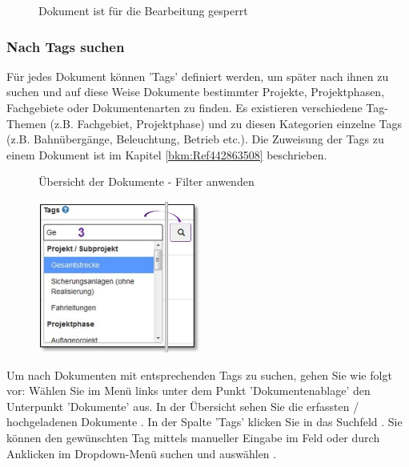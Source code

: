 \begin{figure}[H]
\caption{Dokument ist für die Bearbeitung gesperrt}
\end{figure}

\subsubsection{Nach Tags suchen}
\label{bkm:Ref442275849}

Für jedes Dokument können 'Tags' definiert werden, um später nach ihnen zu suchen und auf diese Weise Dokumente bestimmter Projekte, Projektphasen, Fachgebiete oder Dokumentenarten zu finden. Es existieren verschiedene Tag-Themen (z.B. Fachgebiet, Projektphase) und zu diesen Kategorien einzelne Tags (z.B. Bahnübergänge, Beleuchtung, Betrieb etc.). Die Zuweisung der Tags zu einem Dokument ist im Kapitel \ref{bkm:Ref442863508} beschrieben.

\begin{figure}[H]
\caption{Übersicht der Dokumente - Filter anwenden}
\end{figure}

\begin{figure}
\vspace{-30pt}
\includegraphics[height=50mm]{../chapters/11_Dokumentenablage/pictures/11-2-8_DokTagHinzufuegen.jpg}
\end{figure}
Um nach Dokumenten mit entsprechenden Tags zu suchen, gehen Sie wie folgt vor:
Wählen Sie im Menü links unter dem Punkt 'Dokumentenablage' den Unterpunkt 'Dokumente' aus. In der Übersicht sehen Sie die erfassten / hochgeladenen Dokumente . In der Spalte 'Tags' klicken Sie in das Suchfeld . Sie können den gewünschten Tag mittels manueller Eingabe im Feld oder durch Anklicken im Dropdown-Menü suchen und auswählen .

